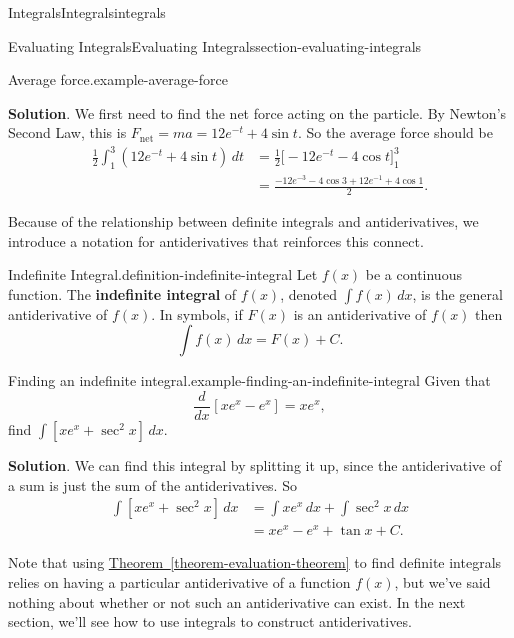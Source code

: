 \documentclass[oneside,10pt,]{book}
\newcommand{\terminology}[1]{\textbf{#1}}
\numberwithin{equation}{section}
\newcommand{\dv}[3][]{\dfrac{d^{#1} #2}{d #3^{#1}}}
\begin{document}
\begin{chapterptx}{Integrals}{}{Integrals}{}{}{integrals}
\begin{sectionptx}{Evaluating Integrals}{}{Evaluating Integrals}{}{}{section-evaluating-integrals}
\begin{example}{Average force.}{example-average-force}
\par\smallskip%
\noindent\textbf{Solution}.\hypertarget{solution-99}{}\quad%
\hypertarget{p-454}{}%
We first need to find the net force acting on the particle. By Newton's Second Law, this is \(F_{\text{net}} = ma = 12e^{-t} + 4\sin t\). So the average force should be%
\begin{align*}
\frac{1}{2}\int_{1}^{3}(12e^{-t} + 4\sin t)\,dt & =  \frac{1}{2}\big[-12e^{-t} - 4\cos t\big]_{1}^{3}\\
& = \frac{-12e^{-3} - 4\cos 3 + 12e^{-1} + 4\cos1}{2}. 
\end{align*}
%
\end{example}
\hypertarget{p-455}{}%
Because of the relationship between definite integrals and antiderivatives, we introduce a notation for antiderivatives that reinforces this connect.%
\begin{definition}{Indefinite Integral.}{definition-indefinite-integral}%
\hypertarget{p-456}{}%
Let \(f(x)\) be a continuous function. The \terminology{indefinite integral} of \(f(x)\), denoted \(\int f(x)\,dx\), is the general antiderivative of \(f(x)\). In symbols, if \(F(x)\) is an antiderivative of \(f(x)\) then%
\begin{equation*}
\int f(x)\,dx = F(x) + C.
\end{equation*}
%
\end{definition}
\begin{example}{Finding an indefinite integral.}{example-finding-an-indefinite-integral}%
\hypertarget{p-457}{}%
Given that%
\begin{equation*}
\dv{}{x}[xe^{x} - e^{x}] = xe^{x},
\end{equation*}
find \(\int [xe^{x}+\sec^{2}x]\,dx\).%
\par\smallskip%
\noindent\textbf{Solution}.\hypertarget{solution-100}{}\quad%
\hypertarget{p-458}{}%
We can find this integral by splitting it up, since the antiderivative of a sum is just the sum of the antiderivatives. So%
\begin{align*}
\int[xe^{x} + \sec^{2}x]\,dx & = \int xe^{x}\,dx + \int\sec^{2}x\,dx \\
& = xe^{x}-e^{x} + \tan x + C. 
\end{align*}
%
\end{example}
\hypertarget{p-459}{}%
Note that using \hyperref[theorem-evaluation-theorem]{Theorem~\ref{theorem-evaluation-theorem}} to find definite integrals relies on having a particular antiderivative of a function \(f(x)\), but we've said nothing about whether or not such an antiderivative can exist. In the next section, we'll see how to use integrals to construct antiderivatives.%

\end{sectionptx}
\end{chapterptx}
\end{document}
